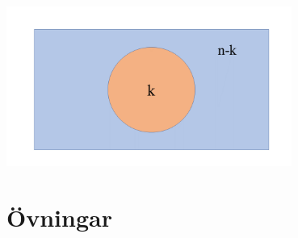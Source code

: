 \documentclass{tufte-handout}
\begin{document}
\begin{center}
    \includegraphics[width=0.7\textwidth]{graphics/komplementbild2.png}
 \end{center}




\section{Övningar}
\end{document}
